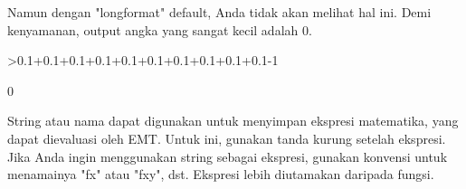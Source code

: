 \documentclass[a4paper,10pt]{article}
\begin{document}
\begin{eulernotebook}
\begin{eulercomment}
\begin{eulercomment}
\begin{eulercomment}
Namun dengan "longformat" default, Anda tidak akan melihat hal ini.
Demi kenyamanan, output angka yang sangat kecil adalah 0.
\end{eulercomment}
\begin{eulerprompt}
>0.1+0.1+0.1+0.1+0.1+0.1+0.1+0.1+0.1+0.1-1
\end{eulerprompt}
\begin{euleroutput}
  0
\end{euleroutput}
\begin{eulercomment}
String atau nama dapat digunakan untuk menyimpan ekspresi matematika,
yang dapat dievaluasi oleh EMT. Untuk ini, gunakan tanda kurung
setelah ekspresi. Jika Anda ingin menggunakan string sebagai ekspresi,
gunakan konvensi untuk menamainya "fx" atau "fxy", dst. Ekspresi lebih
diutamakan daripada fungsi.


\end{eulercomment}
\end{eulercomment}
\end{eulercomment}
\end{eulernotebook}
\end{document}
